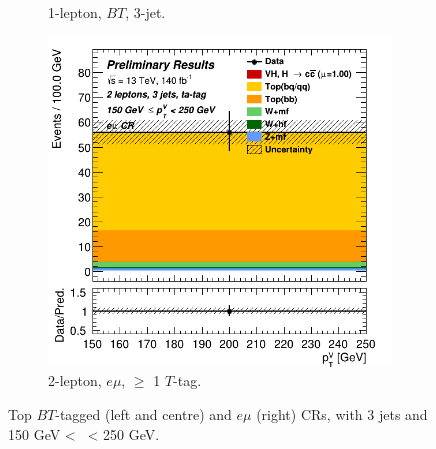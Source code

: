 \begin{figure}[h!]
\begin{subfigure}[b]{0.32\textwidth}
      \caption{1-lepton, $BT$, 3-jet.}
      \label{fig:plots_VHcc_ex_1L_TopCR}
  \end{subfigure}
  \begin{subfigure}[b]{0.32\textwidth}
    \centering
    \includegraphics[width=\textwidth]{Images/VH/Own_fit/prefit_VHcc/Region_distpTV_BMax250_BMin150_Dtopemucr_J3_TTypeta_T2_L2_Y6051_Prefit.png}
    \caption{2-lepton, $e\mu$, $\geq$ 1 $T$-tag.}
    \label{fig:plots_VHcc_ex_2L_TopCR}
\end{subfigure}
  \caption{Top $BT$-tagged (left and centre) and $e\mu$ (right) CRs, with 3 jets and 150 GeV < \ptv\ < 250 GeV.}
  \label{fig:plots_VHcc_ex_TopCR}
\end{figure} 

